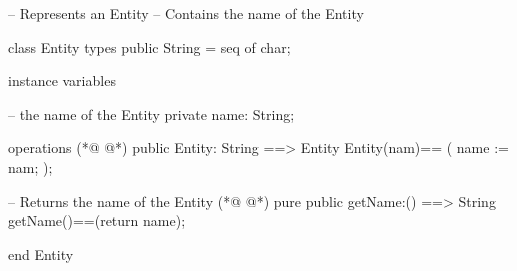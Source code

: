 \begin{vdmpp}[breaklines=true]
-- Represents an Entity
-- Contains the name of the Entity

class Entity 
 types 
  public String = seq of char;
  
 instance variables
 
   -- the name of the Entity
  private name: String;
   
 operations
(*@
\label{Entity:14}
@*)
  public Entity: String ==> Entity
  Entity(nam)==
  (
   name := nam;
  );
  
  -- Returns the name of the Entity
(*@
\label{getName:21}
@*)
  pure public getName:() ==> String
  getName()==(return name);
  
end Entity
\end{vdmpp}
